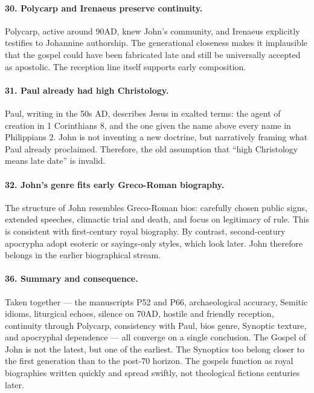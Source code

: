 \paragraph{30.
Polycarp and Irenaeus preserve continuity.}\label{par:polycarp-and-irenaeus-preserve-continuity.}

Polycarp, active around 90AD, knew John’s community, and Irenaeus explicitly testifies to Johannine authorship.
The generational closeness makes it implausible that the gospel could have been fabricated late and still be universally accepted as apostolic.
The reception line itself supports early composition.

\paragraph{31.
Paul already had high Christology.}\label{par:paul-already-had-high-christology.}

Paul, writing in the 50s AD, describes Jesus in exalted terms: the agent of creation in 1 Corinthians 8, and the one given the name above every name in Philippians 2.
John is not inventing a new doctrine, but narratively framing what Paul already proclaimed.
Therefore, the old assumption that “high Christology means late date” is invalid.

\paragraph{32.
John’s genre fits early Greco-Roman biography.}\label{par:johns-genre-fits-early-greco-roman-biography.}

The structure of John resembles Greco-Roman bios: carefully chosen public signs, extended speeches, climactic trial and death, and focus on legitimacy of rule.
This is consistent with first-century royal biography.
By contrast, second-century apocrypha adopt esoteric or sayings-only styles, which look later.
John therefore belongs in the earlier biographical stream.

\paragraph{36.
Summary and consequence.}\label{par:summary-and-consequence.}

Taken together --- the manuscripts P52 and P66, archaeological accuracy, Semitic idioms, liturgical echoes, silence on 70AD, hostile and friendly reception, continuity through Polycarp, consistency with Paul, bios genre, Synoptic texture, and apocryphal dependence --- all converge on a single conclusion.
The Gospel of John is not the latest, but one of the earliest.
The Synoptics too belong closer to the first generation than to the post-70 horizon.
The gospels function as royal biographies written quickly and spread swiftly, not theological fictions centuries later.

